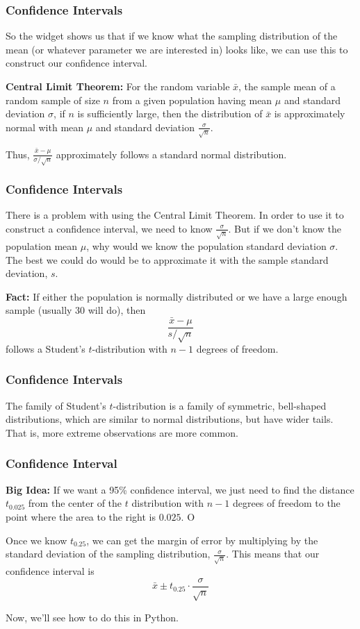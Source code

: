 \documentclass[11pt, table]{beamer}
\newcommand{\p}{\pause}
\begin{document}
\begin{frame}
\frametitle{Confidence Intervals}
So the widget shows us that if we know what the sampling distribution of the mean (or whatever parameter we are interested in) looks like, we can use this to construct our confidence interval. \p
\vspace{0.2in}

\textbf{Central Limit Theorem:} For the random variable $\bar{x}$, the sample mean of a random sample of size $n$ from a given population having mean $\mu$ and standard deviation $\sigma$, if $n$ is sufficiently large, then the distribution of $\bar{x}$ is approximately normal with mean $\mu$ and standard deviation $\frac{\sigma}{\sqrt{n}}$.
\vspace{0.2in}

Thus, $\frac{\bar{x} - \mu}{\sigma / \sqrt{n}}$ approximately follows a standard normal distribution.
\end{frame}

\begin{frame}
\frametitle{Confidence Intervals}
There is a problem with using the Central Limit Theorem. In order to use it to construct a confidence interval, we need to know $\frac{\sigma}{\sqrt{n}}$. But if we don't know the population mean $\mu$, why would we know the population standard deviation $\sigma$. The best we could do would be to approximate it with the sample standard deviation, $s$. 
\vspace{0.2in}

\textbf{Fact:} If either the population is normally distributed or we have a large enough sample (usually 30 will do), then 
$$\frac{\bar{x} - \mu}{s / \sqrt{n}}$$
follows a Student's $t$-distribution with $n-1$ degrees of freedom.
\end{frame}

\begin{frame}
\frametitle{Confidence Intervals}
The family of Student's $t$-distribution is a family of symmetric, bell-shaped distributions, which are similar to normal distributions, but have wider tails. That is, more extreme observations are more common.
\vspace{0.2in}
\end{frame}

\begin{frame}
\frametitle{Confidence Interval}
\textbf{Big Idea:} If we want a 95\% confidence interval, we just need to find the distance $t_{0.025}$ from the center of the $t$ distribution with $n-1$ degrees of freedom to the point where the area to the right is $0.025$. O\vspace{0.1in}

Once we know $t_{0.25}$, we can get the margin of error by multiplying by the standard deviation of the sampling distribution, $\frac{\sigma}{\sqrt{n}}$. This means that our confidence interval is
$$\bar{x} \pm t_{0.25}\cdot\frac{\sigma}{\sqrt{n}}$$

Now, we'll see how to do this in Python.
\end{frame}
\end{document}
